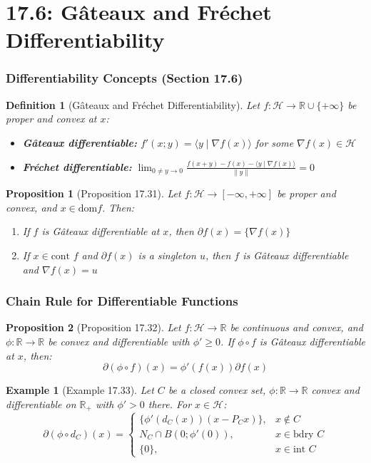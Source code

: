 \documentclass[aspectratio=169,10pt]{beamer}
\newtheorem{prop}{Proposition}
\newtheorem{defn}{Definition}
\newtheorem{exmpl}{Example}
\begin{document}
\section{17.6: Gâteaux and Fréchet Differentiability}
\begin{frame}
  \frametitle{Differentiability Concepts (Section 17.6)}

  \begin{defn}[Gâteaux and Fréchet Differentiability]
    Let $f: \mathcal{H} \to \mathbb{R} \cup \{+\infty\}$ be proper and convex at $x$:
    \begin{itemize}
      \item \textbf{Gâteaux differentiable:} $f'(x; y) = \langle y \mid \nabla f(x) \rangle$ for some $\nabla f(x) \in \mathcal{H}$
      \item \textbf{Fréchet differentiable:} $\lim_{0 \neq y \to 0} \frac{f(x+y) - f(x) - \langle y \mid \nabla f(x) \rangle}{\|y\|} = 0$
    \end{itemize}
  \end{defn}

  \begin{prop}[Proposition 17.31]
    Let $f: \mathcal{H} \to [-\infty, +\infty]$ be proper and convex, and $x \in \text{dom} f$. Then:
    \begin{enumerate}
      \item[(i)] If $f$ is Gâteaux differentiable at $x$, then $\partial f(x) = \{\nabla f(x)\}$
      \item[(ii)] If $x \in \text{cont } f$ and $\partial f(x)$ is a singleton $u$, then $f$ is Gâteaux differentiable and $\nabla f(x) = u$
    \end{enumerate}
  \end{prop}
\end{frame}

\begin{frame}
  \frametitle{Chain Rule for Differentiable Functions}

  \begin{prop}[Proposition 17.32]
    Let $f: \mathcal{H} \to \mathbb{R}$ be continuous and convex, and $\phi: \mathbb{R} \to \mathbb{R}$ be convex and differentiable with $\phi' \geq 0$. If $\phi \circ f$ is Gâteaux differentiable at $x$, then:
    \[
    \partial(\phi \circ f)(x) = \phi'(f(x)) \partial f(x)
    \]
  \end{prop}

  \begin{exmpl}[Example 17.33]
    Let $C$ be a closed convex set, $\phi: \mathbb{R} \to \mathbb{R}$ convex and differentiable on $\mathbb{R}_+$ with $\phi' > 0$ there. For $x \in \mathcal{H}$:
    \[
    \partial(\phi \circ d_C)(x) = \begin{cases}
      \{\phi'(d_C(x))(x - P_{C} x)\}, & x \notin C \\
      N_C \cap B(0; \phi'(0)), & x \in \text{bdry } C \\
      \{0\}, & x \in \text{int } C
    \end{cases}
    \]
  \end{exmpl}
\end{frame}
\end{document}
